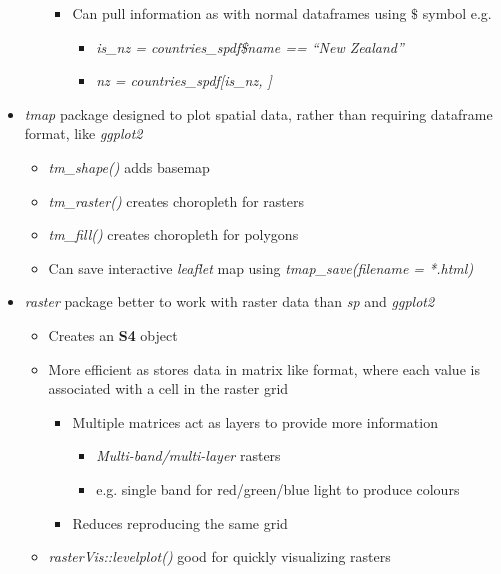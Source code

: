 \documentclass{article}
\begin{document}
\begin{itemize}
\begin{itemize}
\begin{itemize}
            \item Can pull information as with normal dataframes using $\$$ symbol e.g. 
            \begin{itemize}
                \item \textit{is\_nz = countries\_spdf\$name == ``New Zealand''}
                \item \textit{nz = countries\_spdf[is\_nz, ]}
            \end{itemize}
        \end{itemize}
    \end{itemize}
    \item \textit{tmap} package designed to plot spatial data, rather than requiring dataframe format, like \textit{ggplot2}
    \begin{itemize}
        \item \textit{tm\_shape()} adds basemap
        \item \textit{tm\_raster()} creates choropleth for rasters
        \item \textit{tm\_fill()} creates choropleth for polygons
        \item Can save interactive \textit{leaflet} map using \textit{tmap\_save(filename = *.html)}
    \end{itemize}
    \item \textit{raster} package better to work with raster data than \textit{sp} and \textit{ggplot2}
    \begin{itemize}
        \item Creates an \textbf{S4} object
        \item More efficient as stores data in matrix like format, where each value is associated with a cell in the raster grid
        \begin{itemize}
            \item Multiple matrices act as layers to provide more information
            \begin{itemize}
                \item \textit{Multi-band/multi-layer} rasters
                \item e.g. single band for red/green/blue light to produce colours
            \end{itemize}
            \item Reduces reproducing the same grid
        \end{itemize}
        \item \textit{rasterVis::levelplot()} good for quickly visualizing rasters

\end{itemize}
\end{itemize}
\end{document}
